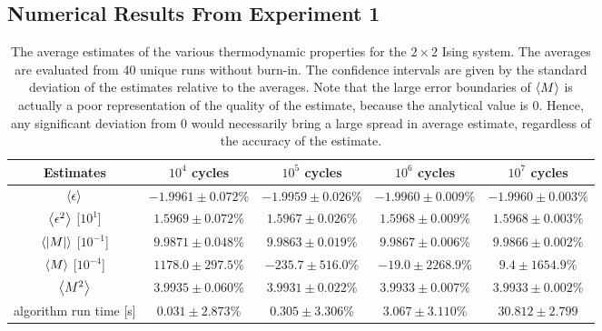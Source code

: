 \documentclass[nofootinbib,reprint,english]{revtex4-1}
\begin{document}
\subsection{Numerical Results From Experiment 1}
\begin{table}[h!]
\centering
\begin{tabular}{|c|c|c|c|c|}
\hline\rule{0pt}{0.32cm}
Estimates & \(10^4\) cycles & \(10^5\) cycles & \(10^6\) cycles & \(10^7\) cycles 
\\\hline\rule{0pt}{0.32cm}
\(\expval{\epsilon}\) &
\(-1.9961\pm0.072\)\% & \(-1.9959\pm0.026\)\% & \(-1.9960\pm0.009\)\% & \(-1.9960\pm0.003\)\%
\\\hline\rule{0pt}{0.32cm}
\(\expval{\epsilon^2}\) [\(10^1\)] &
\(1.5969\pm0.072\)\% & \(1.5967\pm0.026\)\% & \(1.5968\pm0.009\)\% & \(1.5968\pm0.003\)\%
\\\hline\rule{0pt}{0.32cm}
\(\expval{|M|}\) [\(10^{-1}\)] &
\(9.9871\pm0.048\)\% & \(9.9863\pm0.019\)\% & \(9.9867\pm0.006\)\% & \(9.9866\pm0.002\)\%
\\\hline\rule{0pt}{0.32cm}
\(\expval{M}\) [\(10^{-4}\)] &
\(1178.0\pm297.5\)\% & \(-235.7\pm516.0\)\% & \(-19.0\pm2268.9\)\% & \(9.4\pm1654.9\)\%
\\\hline\rule{0pt}{0.32cm}
\(\expval{M^2}\) &
\(3.9935\pm0.060\)\% & \(3.9931\pm0.022\)\% & \(3.9933\pm0.007\)\% & \(3.9933\pm0.002\)\%
\\\hline\rule{0pt}{0.32cm}
algorithm run time [s] &
\(0.031\pm2.873\)\% & \(0.305\pm3.306\)\% & \(3.067\pm3.110\)\% & \(30.812\pm2.799\)
\\\hline
\end{tabular}
\caption{The average estimates of the various thermodynamic properties for the \(2\times2\) Ising system. The averages are evaluated from 40 unique runs without burn-in. The confidence intervals are given by the standard deviation of the estimates relative to the averages. Note that the large error boundaries of \(\expval{M}\) is actually a poor representation of the quality of the estimate, because the analytical value is 0. Hence, any significant deviation from 0 would necessarily bring a large spread in average estimate, regardless of the accuracy of the estimate.}\label{tab:2by2_simulation_results}
\end{table}
\end{document}
